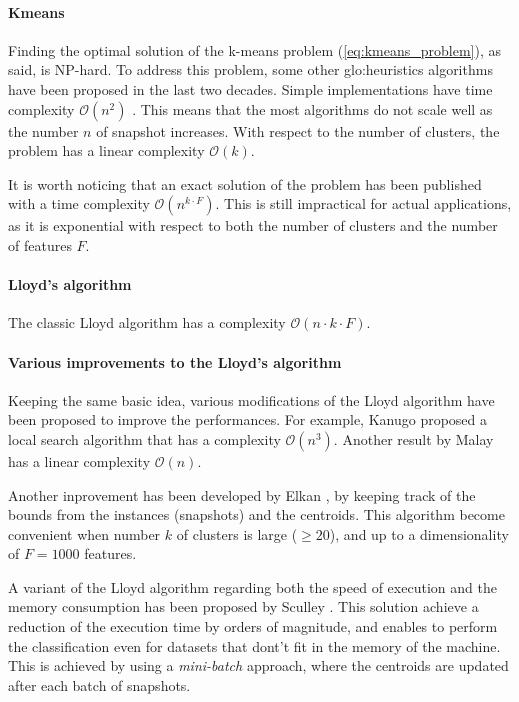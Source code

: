 \paragraph*{Kmeans}
Finding the optimal solution of the k-means problem (\autoref{eq:kmeans_problem}), as said, is NP-hard.
To address this problem, some other {\gls{glo:heuristic}}s algorithms have been proposed in the last two decades. Simple implementations have time complexity $\mathcal{O}(n^2)$ \cite{Kmeans_linear}.  This means that the most algorithms do not scale well as the number $n$ of snapshot increases. With respect to the number of clusters, the problem has a linear complexity $\mathcal{O}(k)$.

It is worth noticing that an exact solution of the problem has been published \cite{Kmeans_vornoi_japan} with a time complexity $\mathcal{O}(n^{k\cdot F})$. This is still impractical for actual applications, as it is exponential with respect to both the number of clusters and the number of features $F$.

\paragraph*{Lloyd's algorithm}
The classic Lloyd algorithm \cite{Lloyd1982} has a complexity $\mathcal{O}(n\cdot k\cdot F )$.

\paragraph*{Various improvements to the Lloyd's algorithm} Keeping the same basic idea, various modifications of the Lloyd algorithm have been proposed to improve the performances. For example, Kanugo \cite{kanungo2004local} proposed a local search algorithm that has a complexity $\mathcal{O}(n^3)$. Another result by Malay \cite{Kmeans_linear} has a linear complexity $\mathcal{O}(n)$. 

Another inprovement has been developed by Elkan \cite{kmeans-accelerated}, by keeping track of the bounds from the instances (snapshots) and the centroids. This algorithm become convenient when number $k$ of clusters is large ($\geq 20$), and up to a dimensionality of $F=1000$ features.

A variant of the Lloyd algorithm regarding both the speed of execution and the memory consumption has been proposed by Sculley \cite{Sculley2010}. This solution achieve a reduction of the execution time by orders of magnitude, and enables to perform the classification even for datasets that dont't fit in the memory of the machine. This is achieved by using a \emph{mini-batch} approach, where the centroids are updated after each batch of snapshots.

